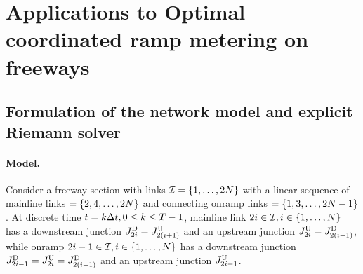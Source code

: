 
\section{Applications to Optimal coordinated ramp metering on freeways\label{sec:Applications-to-Optimal}}


\subsection{Formulation of the network model and explicit Riemann solver\label{sub:Formulation-of-the}}


\paragraph{Model.}

Consider a freeway section with links $\links=\intrange 1{2\nlinks}$
with a linear sequence of mainline links $=\intrange{2,4}{2\nlinks}$
and connecting onramp links $=\intrange{1,3}{2\nlinks-1}$. At discrete
time $t=k\Delta t,0\le k\le T-1$, mainline link $2\link\in\links,i\in\intrange 1{\nlinks}$
has a downstream junction $\jdown{2\link}=\jup{2\left(\link+1\right)}$
and an upstream junction $\jup{2\link}=\jdown{2\left(\link-1\right)}$,
while onramp $2\link-1\in\links,i\in\intrange 1{\nlinks}$ has a downstream
junction $\jdown{2\link-1}=\jup{2\link}=\jdown{2\left(\link-1\right)}$
and an upstream junction $J_{2i-1}^{\text{U}}$.

